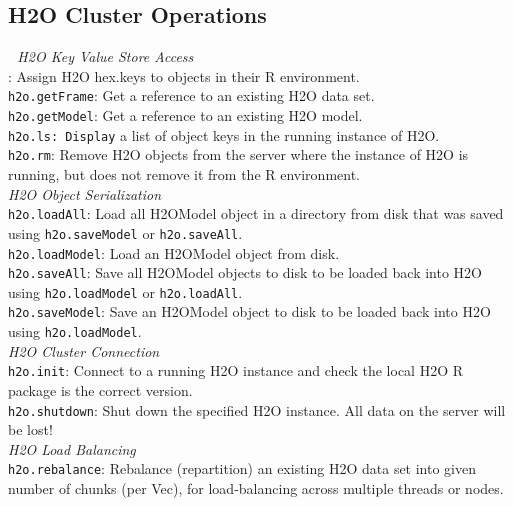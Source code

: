 \documentclass[11pt]{article}
\begin{document}
\begin{enumerate}
{\subsection{H2O Cluster Operations} 
\textit{H2O Key Value Store Access}\\

{}: Assign H2O hex.keys to objects in their R environment.\\
{\texttt{h2o.getFrame}}: Get a reference to an existing H2O data set. \\
{\texttt{h2o.getModel}}: Get a reference to an existing H2O model. \\
{\texttt{h2o.ls: Display}} a list of object keys in the running instance of H2O. \\
{\texttt{h2o.rm}}: Remove H2O objects from the server where the instance of H2O is running, but does not remove it from the R environment.\\

\textit{H2O Object Serialization}\\

{\texttt{h2o.loadAll}}: Load all H2OModel object in a directory from disk that was saved using {\texttt{h2o.saveModel}} or {\texttt{h2o.saveAll}}.\\
{\texttt{h2o.loadModel}}: Load an H2OModel object from disk.\\
{\texttt{h2o.saveAll}}: Save all H2OModel objects to disk to be loaded back into H2O using {\texttt{h2o.loadModel}} or {\texttt{h2o.loadAll}}.\\
{\texttt{h2o.saveModel}}: Save an H2OModel object to disk to be loaded back into H2O using {\texttt{h2o.loadModel}}.\\

\textit{H2O Cluster Connection}\\

{\texttt{h2o.init}}: Connect to a running H2O instance and check the local H2O R package is the correct version.\\
{\texttt{h2o.shutdown}}: Shut down the specified H2O instance. All data on the server will be lost!\\

\textit{H2O Load Balancing}\\

{\texttt{h2o.rebalance}}: Rebalance (repartition) an existing H2O data set into given number of chunks (per Vec), for load-balancing across multiple threads or nodes.\\

}
\end{enumerate}
\end{document}
